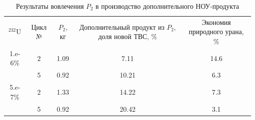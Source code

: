 \begin{table}[h]
  \centering
  \normalsize\begin{tabulary}{1.0\textwidth}{CCCCC}
  $^{232}$U & Цикл № & $P_2$, кг & Дополнительный продукт из $P_2$, доля новой ТВС, \% & Экономия природного урана, \% \\
  1.e-6\% & 2 & 1.09 & 7.11 & 14.6 \\
   & 5 & 0.92 & 10.21 & 6.3 \\
  5.e-7\% & 2 & 1.33 & 14.22 & 7.3 \\
   & 5 & 0.92 & 20.42 & 3.1 \\
  \end{tabulary}
  \caption{{Результаты вовлечения $P_2$ в производство дополнительного НОУ-продукта{\label{independent}}%
  }}
\end{table}

